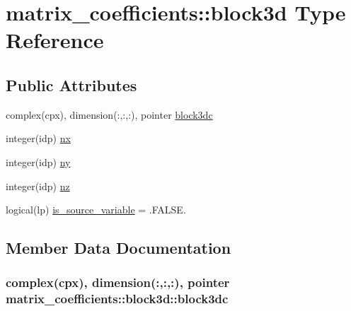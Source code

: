 \hypertarget{structmatrix__coefficients_1_1block3d}{}\section{matrix\+\_\+coefficients\+:\+:block3d Type Reference}
\label{structmatrix__coefficients_1_1block3d}
\subsection*{Public Attributes}
\begin{DoxyCompactItemize}
\item 
complex(cpx), dimension(\+:,\+:,\+:), pointer \hyperlink{structmatrix__coefficients_1_1block3d_a99914e62a62db923fcb366de146e92e0}{block3dc}
\item 
integer(idp) \hyperlink{structmatrix__coefficients_1_1block3d_af4e4f83e09cc6967c8204cd22ba39ce7}{nx}
\item 
integer(idp) \hyperlink{structmatrix__coefficients_1_1block3d_a5b50d6852afa142b18507bed4feaf58f}{ny}
\item 
integer(idp) \hyperlink{structmatrix__coefficients_1_1block3d_aaef29da070e781dbf45d55e239521f98}{nz}
\item 
logical(lp) \hyperlink{structmatrix__coefficients_1_1block3d_af59d38ae8117a5aae265ed57357fd9a4}{is\+\_\+source\+\_\+variable} = .F\+A\+L\+S\+E.
\end{DoxyCompactItemize}


\subsection{Member Data Documentation}
\subsubsection[{\texorpdfstring{block3dc}{block3dc}}]{\setlength{\rightskip}{0pt plus 5cm}complex(cpx), dimension(\+:,\+:,\+:), pointer matrix\+\_\+coefficients\+::block3d\+::block3dc}\hypertarget{structmatrix__coefficients_1_1block3d_a99914e62a62db923fcb366de146e92e0}{}\label{structmatrix__coefficients_1_1block3d_a99914e62a62db923fcb366de146e92e0}
